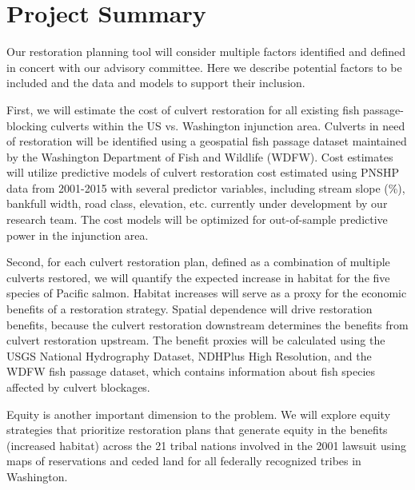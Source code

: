 \documentclass[12pt]{elsarticle}
\begin{document}
\section{Project Summary} %

Our restoration planning tool will consider multiple factors identified and defined in concert with our advisory committee. Here we describe potential factors to be included and the data and models to support their inclusion.   

First, we will estimate the cost of culvert restoration for all existing fish passage-blocking culverts within the US vs. Washington injunction area. Culverts in need of restoration will be identified using a geospatial fish passage dataset maintained by the Washington Department of Fish and Wildlife (WDFW). Cost estimates will utilize predictive models of culvert restoration cost estimated using PNSHP data from 2001-2015 with several predictor variables, including stream slope (\%), bankfull width, road class, elevation, etc. currently under development by our research team. The cost models will be optimized for out-of-sample predictive power in the injunction area.

Second, for each culvert restoration plan, defined as a combination of multiple culverts restored, we will quantify the expected increase in habitat for the five species of Pacific salmon. Habitat increases will serve as a proxy for the economic benefits of a restoration strategy. Spatial dependence will drive restoration benefits, because the culvert restoration downstream determines the benefits from culvert restoration upstream. The benefit proxies will be calculated using the USGS National Hydrography Dataset, NDHPlus High Resolution, and the WDFW fish passage dataset, which contains information about fish species affected by culvert blockages.

Equity is another important dimension to the problem. We will explore equity strategies that prioritize restoration plans that generate equity in the benefits (increased habitat) across the 21 tribal nations involved in the 2001 lawsuit using maps of reservations and ceded land for all federally recognized tribes in Washington. 
\end{document}
